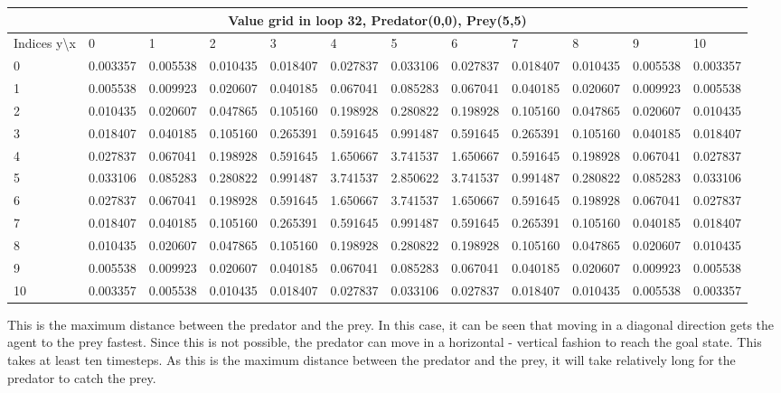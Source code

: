 \documentclass{article}
\begin{document}
\begin{center}
\scalebox{0.7}
	{
	\begin{tabular}{ |l | l | l | l | l | l | l | l | l | l | l | l|}
	\hline
	\multicolumn{12}{|c|}{Value grid in loop 32, Predator(0,0), Prey(5,5)}\\
	\hline
	Indices y\textbackslash x &0 & 1 & 2 & 3 & 4 & 5 & 6 & 7 & 8 & 9 & 10 \\ 

\hline
0 & \cellcolor{green!40}0.003357 & 0.005538 & 0.010435 & 0.018407 & 0.027837 & 0.033106 & 0.027837 & 0.018407 & 0.010435 & 0.005538 & 0.003357 \\
1 & 0.005538 & 0.009923 & 0.020607 & 0.040185 & 0.067041 & 0.085283 & 0.067041 & 0.040185 & 0.020607 & 0.009923 & 0.005538 \\
2 & 0.010435 & 0.020607 & 0.047865 & 0.105160 & 0.198928 & 0.280822 & 0.198928 & 0.105160 & 0.047865 & 0.020607 & 0.010435 \\
3 & 0.018407 & 0.040185 & 0.105160 & 0.265391 & 0.591645 & 0.991487 & 0.591645 & 0.265391 & 0.105160 & 0.040185 & 0.018407 \\
4 & 0.027837 & 0.067041 & 0.198928 & 0.591645 & 1.650667 & 3.741537 & 1.650667 & 0.591645 & 0.198928 & 0.067041 & 0.027837 \\
5 & 0.033106 & 0.085283 & 0.280822 & 0.991487 & 3.741537 & \cellcolor{red!40}2.850622 & 3.741537 & 0.991487 & 0.280822 & 0.085283 & 0.033106 \\
6 & 0.027837 & 0.067041 & 0.198928 & 0.591645 & 1.650667 & 3.741537 & 1.650667 & 0.591645 & 0.198928 & 0.067041 & 0.027837 \\
7 & 0.018407 & 0.040185 & 0.105160 & 0.265391 & 0.591645 & 0.991487 & 0.591645 & 0.265391 & 0.105160 & 0.040185 & 0.018407 \\
8 & 0.010435 & 0.020607 & 0.047865 & 0.105160 & 0.198928 & 0.280822 & 0.198928 & 0.105160 & 0.047865 & 0.020607 & 0.010435 \\
9 & 0.005538 & 0.009923 & 0.020607 & 0.040185 & 0.067041 & 0.085283 & 0.067041 & 0.040185 & 0.020607 & 0.009923 & 0.005538 \\
10 & 0.003357 & 0.005538 & 0.010435 & 0.018407 & 0.027837 & 0.033106 & 0.027837 & 0.018407 & 0.010435 & 0.005538 & 0.003357 \\
\hline
	\end{tabular}
	}
\end{center}

This is the maximum distance between the predator and the prey. In this case, it can be seen that moving in a diagonal direction gets the agent to the prey fastest. Since this is not possible, the predator can move in a horizontal - vertical fashion to reach the goal state. This takes at least ten timesteps. As this is the maximum distance between the predator and the prey, it will take relatively long for the predator to catch the prey.
\end{document}
